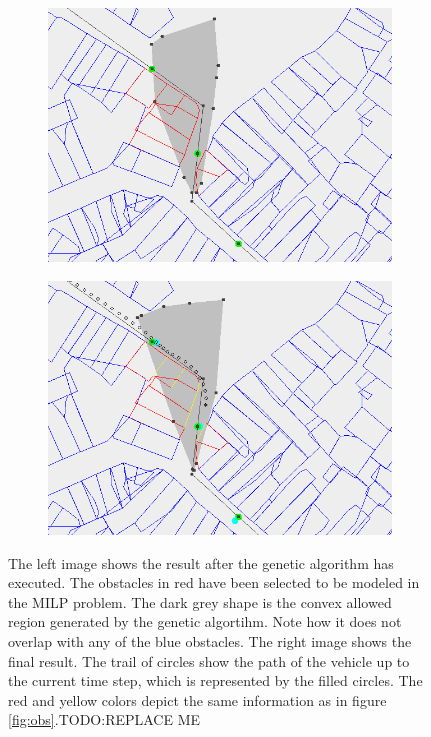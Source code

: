 \begin{figure}[!t]
    \centering
    \begin{subfigure}[t]{0.47\textwidth}
        \includegraphics[width=\textwidth]{img/pre3}
    \end{subfigure}
    \hfil
    \begin{subfigure}[t]{0.47\textwidth}
        \includegraphics[width=\textwidth]{img/pre4}
    \end{subfigure}
    \caption[TODO:REPLACE ME. preprocessing step 3 and 4]{The left image shows the result after the genetic algorithm has executed. The obstacles in red have been selected to be modeled in the MILP problem. The dark grey shape is the convex allowed region generated by the genetic algortihm. Note how it does not overlap with any of the blue obstacles. The right image shows the final result. The trail of circles show the path of the vehicle up to the current time step, which is represented by the filled circles. The red and yellow colors depict the same information as in figure \ref{fig:obs}.TODO:REPLACE ME}\label{fig:pre-3-4}
\end{figure}






